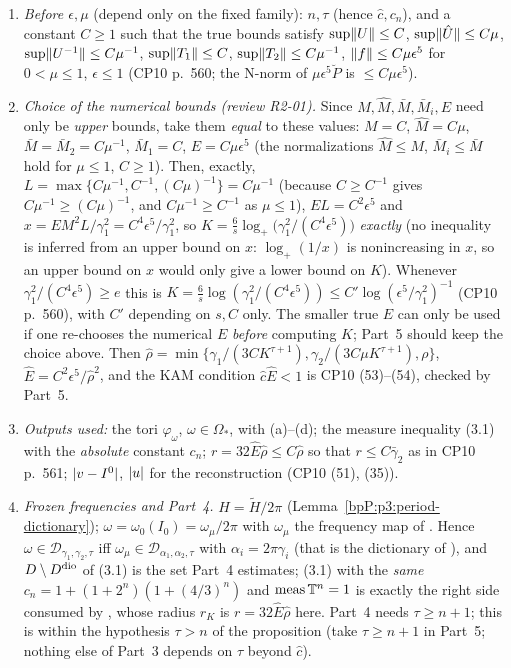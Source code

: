 \begin{enumerate}[label=(\arabic*)]
\item \emph{Before $\epsilon,\mu$} (depend only on the fixed family): $n,\tau$ (hence $\hat c,c_n$), and a constant $C\ge1$ such that the true bounds satisfy $\sup\lVert U\rVert\le C$, $\sup\lVert \hat U\rVert\le C\mu$, $\sup\lVert U^{-1}\rVert\le C\mu^{-1}$, $\sup\lVert T_1\rVert\le C$, $\sup\lVert T_2\rVert\le C\mu^{-1}$, $\lVert f\rVert\le C\mu\epsilon^5$ for $0<\mu\le1$, $\epsilon\le1$ (CP10 p.~560; the N-norm of $\mu\epsilon^5\breve P$ is $\le C\mu\epsilon^5$).
\item \emph{Choice of the numerical bounds (review R2-01).} Since $M,\hat M,\bar M,\bar M_i,E$ need only be \emph{upper} bounds, take them \emph{equal} to these values: $M=C$, $\hat M=C\mu$, $\bar M=\bar M_2=C\mu^{-1}$, $\bar M_1=C$, $E=C\mu\epsilon^5$ (the normalizations $\hat M\le M$, $\bar M_i\le\bar M$ hold for $\mu\le1$, $C\ge1$). Then, exactly, $L=\max\{C\mu^{-1},C^{-1},(C\mu)^{-1}\}=C\mu^{-1}$ (because $C\ge C^{-1}$ gives $C\mu^{-1}\ge(C\mu)^{-1}$, and $C\mu^{-1}\ge C^{-1}$ as $\mu\le1$), $EL=C^2\epsilon^5$ and
$x=EM^2L/\gamma_1^2=C^4\epsilon^5/\gamma_1^2$, so $K=\frac6s\log_+\bigl(\gamma_1^2/(C^4\epsilon^5)\bigr)$ \emph{exactly} (no inequality is inferred from an upper bound on $x$: $\log_+(1/x)$ is nonincreasing in $x$, so an upper bound on $x$ would only give a lower bound on $K$). Whenever $\gamma_1^2/(C^4\epsilon^5)\ge e$ this is $K=\frac6s\log(\gamma_1^2/(C^4\epsilon^5))\le C'\log(\epsilon^5/\gamma_1^2)^{-1}$ (CP10 p.~560), with $C'$ depending on $s,C$ only. The smaller true $E$ can only be used if one re-chooses the numerical $E$ \emph{before} computing $K$; Part~5 should keep the choice above. Then $\hat\rho=\min\{\gamma_1/(3CK^{\tau+1}),\gamma_2/(3C\mu K^{\tau+1}),\rho\}$, $\hat E=C^2\epsilon^5/\hat\rho^2$, and the KAM condition $\hat c\hat E<1$ is CP10 (53)--(54), checked by Part~5.
\item \emph{Outputs used:} the tori $\varphi_\omega$, $\omega\in\Omega_*$, with (a)--(d); the measure inequality (3.1) with the \emph{absolute} constant $c_n$; $r=32\hat E\hat\rho\le C\hat\rho$ so that $r\le C\bar\gamma_2$ as in CP10 p.~561; $\lvert v-I^0\rvert$, $\lvert u\rvert$ for the reconstruction (CP10 (51), (35)).
\item \emph{Frozen frequencies and Part~4.} $H=\tilde H/2\pi$ (Lemma~\ref{bpP:p3:period-dictionary}); $\omega=\omega_0(I_0)=\omega_\mu/2\pi$ with $\omega_\mu$ the frequency map of . Hence $\omega\in\mathcal D_{\gamma_1,\gamma_2,\tau}$ iff $\omega_\mu\in\mathcal D_{\alpha_1,\alpha_2,\tau}$ with $\alpha_i=2\pi\gamma_i$ (that is the dictionary of ), and $D\setminus D^{\rm dio}$ of (3.1) is the set Part~4 estimates; (3.1) with the \emph{same} $c_n=1+(1+2^n)(1+(4/3)^n)$ and $\operatorname{meas}\mathbb{T}^n=1$ is exactly the right side consumed by , whose radius $r_K$ is $r=32\hat E\hat\rho$ here. Part~4 needs $\tau\ge n+1$; this is within the hypothesis $\tau>n$ of the proposition (take $\tau\ge n+1$ in Part~5; nothing else of Part~3 depends on $\tau$ beyond $\hat c$).

\end{enumerate}
